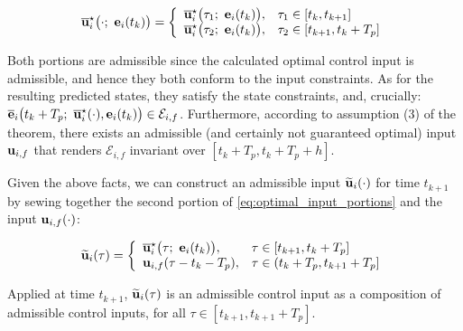 \begin{equation}
  \overline{\bm{\mathbf{u}}}_i^{\star}\big(\cdot;\ \bm{\mathbf{e}}_i(t_k)\big) = \left\{
      \begin{array}{ll}
        \overline{\bm{\mathbf{u}}}_i^{\star}\big(\tau_1;\ \bm{\mathbf{e}}_i(t_k)\big), & \tau_1 \in [t_k, t_{k+1}] \\
        \overline{\bm{\mathbf{u}}}_i^{\star}\big(\tau_2;\ \bm{\mathbf{e}}_i(t_k)\big), & \tau_2 \in [t_{k+1}, t_k + T_p]
      \end{array}
      \right.
  \label{eq:optimal_input_portions}
\end{equation}

Both portions are admissible since the calculated optimal control input is
admissible, and hence they both conform to the input constraints.
As for the resulting predicted states, they satisfy the state constraints, and,
crucially: $\overline{\bm{\mathbf{e}}}_i\big(t_k + T_p;\ \overline{\bm{\mathbf{u}}}_i^{\star}(\cdot), \bm{\mathbf{e}}_i(t_k)\big) \in \mathcal{E}_{i,f}$.
Furthermore, according to assumption (3) of the theorem, there exists an
admissible (and certainly not guaranteed optimal) input $\bm{\mathbf{u}}_{i,f}$ that
renders $\mathcal{E}_{i,f}$ invariant over $[t_k + T_p, t_k + T_p + h]$.

Given the above facts, we can construct an admissible input
$\widetilde{\bm{\mathbf{u}}}_i(\cdot)$  for time $t_{k+1}$ by sewing together the second
portion of \eqref{eq:optimal_input_portions} and the input
$\bm{\mathbf{u}}_{i,f}(\cdot)$:

\begin{equation}
  \widetilde{\bm{\mathbf{u}}}_i(\tau) = \left\{
      \begin{array}{ll}
        \overline{\bm{\mathbf{u}}}_i^{\star}\big(\tau;\ \bm{\mathbf{e}}_i(t_k)\big), & \tau \in [t_{k+1}, t_k + T_p] \\
        \bm{\mathbf{u}}_{i,f}(\tau - t_k - T_p), & \tau \in (t_k + T_p, t_{k+1} + T_p]
      \end{array}
      \right.
\label{eq:optimal_input_t_plus_one}
\end{equation}

Applied at time $t_{k+1}$, $\widetilde{\bm{\mathbf{u}}}_i(\tau)$
is an admissible control input as a composition of admissible control inputs,
for all $\tau \in [t_{k+1}, t_{k+1} + T_p]$.

